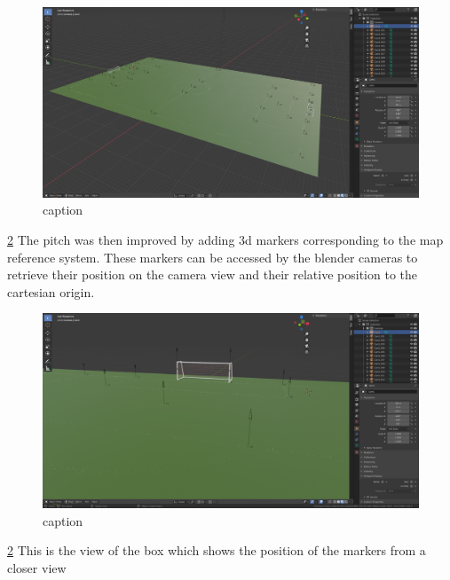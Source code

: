 \documentclass[
11pt,
twoside
]{report}
\begin{document}
\begin{figure}[H]
    \includegraphics[keepaspectratio, width=\columnwidth]{Screenshot_2022-03-05_12-03-42.png}
    \caption{caption}
    \label{img:1}
\end{figure}
\ref{img:1} The pitch was then improved by adding 3d markers corresponding to the map reference system. These markers can be accessed by the blender cameras to retrieve their position on the camera view and their relative position to the cartesian origin.

\begin{figure}[H]
    \includegraphics[keepaspectratio, width=\columnwidth]{Screenshot_2022-03-05_12-45-59.png}
    \caption{caption}
    \label{img:1}
\end{figure}
\ref{img:1} This is the view of the box which shows the position of the markers from a closer view
\end{document}
